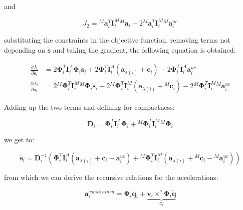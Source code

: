 and

\begin{equation}
    J _2 = {} ^M \mathbf{a} ^T _i \mathbf{I} ^M _i {} ^M \mathbf{a} _i - 2 {} ^M \mathbf{a} ^T _i \mathbf{I} ^M _i {} ^M \mathbf{a} ^{uc} _i
\end{equation}

substituting the constraints in the objective function, removing terms not depending on $\ddot{\mathbf{s}}$ and taking the gradient, the following equation is obtained:

\begin{align}
    \frac{\partial J _1}{\partial \ddot{\mathbf{s}} _i} & = 2 \boldsymbol{\Phi} ^T _i \mathbf{I} ^A _i \boldsymbol{\Phi} _i \ddot{\mathbf{s}} _i + 2 \boldsymbol{\Phi} ^T _i \mathbf{I} ^A _i (\mathbf{a} _{\lambda (i)} + \mathbf{c} _i) - 2 \boldsymbol{\Phi} ^T _i \mathbf{I} ^A _i \mathbf{a} ^{uc} _i \nonumber                                        \\
    \frac{\partial J _2}{\partial \ddot{\mathbf{s}} _i} & = 2 {} ^M \boldsymbol{\Phi} ^T _i \mathbf{I} ^M _i {} ^M \boldsymbol{\Phi} _i \ddot{\mathbf{s}} _i + 2 {} ^M  \boldsymbol{\Phi} ^T _i \mathbf{I} ^M _i (\mathbf{a} _{\lambda (i)} + {} ^M  \mathbf{c} _i) - 2 {} ^M \boldsymbol{\Phi} ^T _i \mathbf{I} ^M _i {} ^M \mathbf{a} ^{uc} _i  \nonumber
\end{align}

Adding up the two terms and defining for compactness:

\begin{equation}
    \mathbf{D} _i = \boldsymbol{\Phi} ^T _i \mathbf{I} ^A _i \boldsymbol{\Phi} _i + {} ^M \boldsymbol{\Phi} ^T _i \mathbf{I} ^M _i {} ^M \boldsymbol{\Phi} _i
\end{equation}

we get to:

\begin{equation}
    \ddot{\mathbf{s}} _i = \mathbf{D} _i ^{-1} (\boldsymbol{\Phi} ^T _i \mathbf{I} ^A _i (\mathbf{a} _{\lambda (i)} + \mathbf{c} _i - \mathbf{a} ^{uc} _i) + {} ^M \boldsymbol{\Phi} ^T _i \mathbf{I} ^M _i ( \mathbf{a} _{\lambda (i)} + {} ^M \mathbf{c} _i - {} ^M \mathbf{a} ^{uc} _i))
\end{equation}

from which we can derive the recursive relations for the accelerations:

\begin{equation}
    \mathbf{a} ^{constrained} _i = \boldsymbol{\Phi} _i \ddot{\mathbf{q}} _i + \underbrace{\mathbf{v} _i \times ^* \boldsymbol{\Phi} _i \dot{\mathbf{q}}} _{\mathbf{c} _i}
\end{equation}

